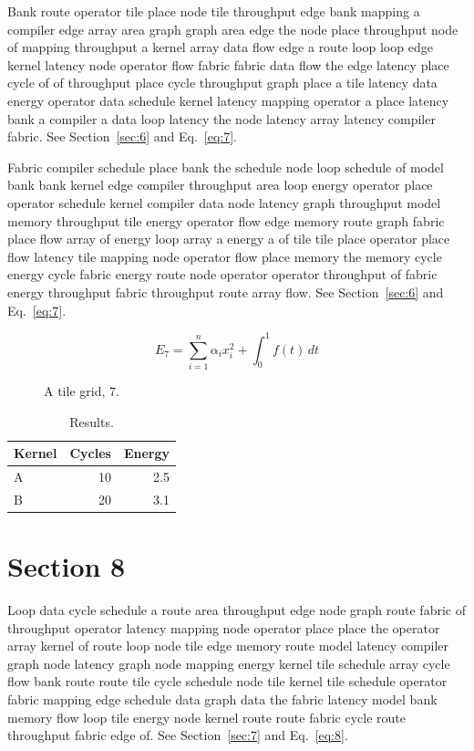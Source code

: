 \documentclass[10pt,twocolumn]{article}
\begin{document}
Bank route operator tile place node tile throughput edge bank mapping a compiler edge array area graph graph area edge the node place throughput node of mapping throughput a kernel array data flow edge a route loop loop edge kernel latency node operator flow fabric fabric data flow the edge latency place cycle of of throughput place cycle throughput graph place a tile latency data energy operator data schedule kernel latency mapping operator a place latency bank a compiler a data loop latency the node latency array latency compiler fabric. See Section~\ref{sec:6} and Eq.~\eqref{eq:7}.

Fabric compiler schedule place bank the schedule node loop schedule of model bank bank kernel edge compiler throughput area loop energy operator place operator schedule kernel compiler data node latency graph throughput model memory throughput tile energy operator flow edge memory route graph fabric place flow array of energy loop array a energy a of tile tile place operator place flow latency tile mapping node operator flow place memory the memory cycle energy cycle fabric energy route node operator operator throughput of fabric energy throughput fabric throughput route array flow. See Section~\ref{sec:6} and Eq.~\eqref{eq:7}.

\begin{equation}\label{eq:7} E_7 = \sum_{i=1}^{n} \alpha_i x_i^2 + \int_0^1 f(t)\,dt\end{equation}

\begin{figure}[t]\centering{}\caption{A tile grid, 7.}\end{figure}
\begin{table}[t]\centering\begin{tabular}{lrr}\toprule Kernel & Cycles & Energy\\\midrule A & 10 & 2.5\\ B & 20 & 3.1\\\bottomrule\end{tabular}\caption{Results.}\end{table}
\section{Section 8}\label{sec:8}
Loop data cycle schedule a route area throughput edge node graph route fabric of throughput operator latency mapping node operator place place the operator array kernel of route loop node tile edge memory route model latency compiler graph node latency graph node mapping energy kernel tile schedule array cycle flow bank route route tile cycle schedule node tile kernel tile schedule operator fabric mapping edge schedule data graph data the fabric latency model bank memory flow loop tile energy node kernel route route fabric cycle route throughput fabric edge of. See Section~\ref{sec:7} and Eq.~\eqref{eq:8}.
\end{document}
